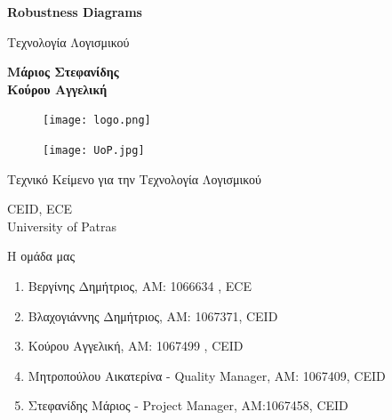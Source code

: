 \documentclass{article}
\begin{document}

\begin{titlepage}
   \begin{center}
       \vspace*{1cm}

       \textbf{\huge Robustness Diagrams}

       \vspace{0.5cm}
        Τεχνολογία Λογισμικού
            
       \vspace{1cm}

       \textbf{Μάριος Στεφανίδης\\Κούρου Αγγελική}
       
       
       \begin{figure}[!htb]
        \centering
        \texttt{[image: logo.png]}
        \end{figure}
        
        \vspace{0.5cm}
        
        \begin{figure}[!htb]
        \centering
        \texttt{[image: UoP.jpg]}
        \end{figure}


       \vfill
            
       Τεχνικό Κείμενο για την Τεχνολογία Λογισμικού\\
            
       \vspace{0.5cm}
            
       CEID, ECE\\
       University of Patras\\
            
   \end{center}
\end{titlepage}



\noindent Η ομάδα μας

\begin{enumerate}
  \item Βεργίνης Δημήτριος, ΑΜ: 1066634 , ECE
  \item Βλαχογιάννης Δημήτριος, ΑΜ: 1067371, CEID
  \item Κούρου Αγγελική, ΑΜ: 1067499 , CEID
  \item Μητροπούλου Αικατερίνα - Quality Manager, ΑΜ: 1067409, CEID
  \item Στεφανίδης Μάριος - Project Manager, ΑΜ:1067458, CEID
\end{enumerate}
\end{document}

